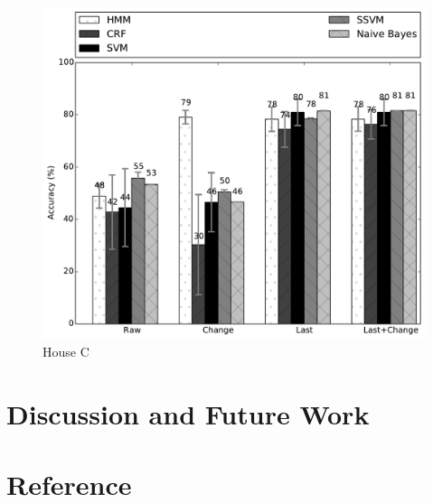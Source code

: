 \documentclass[11pt, oneside]{article}   	%
\begin{document}
\begin{figure}[t!]
\begin{center}
\includegraphics[width=5in]{../../src/reports/C.pdf}
\end{center}
\vspace{-0.5cm}
\caption{House C}
\label{fig:house_3}
\vspace{-0.5cm}
\end{figure}

\section{Discussion and Future Work}


\section{Reference}
\end{document}
